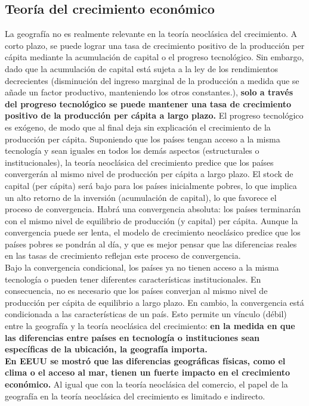 \subsection{Teoría del crecimiento económico}
La geografía no es realmente relevante en la teoría neoclásica del crecimiento. A corto plazo, se puede lograr una tasa de crecimiento positivo de la producción per cápita mediante la acumulación de capital o el progreso tecnológico. Sin embargo, dado que la acumulación de capital está sujeta a la ley de los rendimientos decrecientes (disminución del ingreso marginal de la producción a medida que se añade un factor productivo, manteniendo los otros constantes.), \textbf{solo a través del progreso tecnológico se puede mantener una tasa de crecimiento positivo de la producción per cápita a largo plazo.} El progreso tecnológico es exógeno, de modo que al final deja sin explicación el crecimiento de la producción per cápita. Suponiendo que los países tengan acceso a la misma tecnología y sean iguales en todos los demás aspectos (estructurales o institucionales), la teoría neoclásica del crecimiento predice que los países convergerán al mismo nivel de producción per cápita a largo plazo. El stock de capital (per cápita) será bajo para los países inicialmente pobres, lo que implica un alto retorno de la inversión (acumulación de capital), lo que favorece el proceso de convergencia. Habrá una convergencia absoluta: los países terminarán con el mismo nivel de equilibrio de producción (y capital) per cápita. Aunque la convergencia puede ser lenta, el modelo de crecimiento neoclásico predice que los países pobres se pondrán al día, y que es mejor pensar que las diferencias reales en las tasas de crecimiento reflejan este proceso de convergencia.\\
Bajo la convergencia condicional, los países ya no tienen acceso a la misma tecnología o pueden tener diferentes características institucionales. En consecuencia, no es necesario que los países converjan al mismo nivel de producción per cápita de equilibrio a largo plazo. En cambio, la convergencia está condicionada a las características de un país. Esto permite un vínculo (débil) entre la geografía y la teoría neoclásica del crecimiento: \textbf{en la medida en que las diferencias entre países en tecnología o instituciones sean específicas de la ubicación, la geografía importa.}\\
\textbf{En EEUU se mostró que las diferencias geográficas físicas, como el clima o el acceso al mar, tienen un fuerte impacto en el crecimiento económico.} Al igual que con la teoría neoclásica del comercio, el papel de la geografía en la teoría neoclásica del crecimiento es limitado e indirecto.\\
